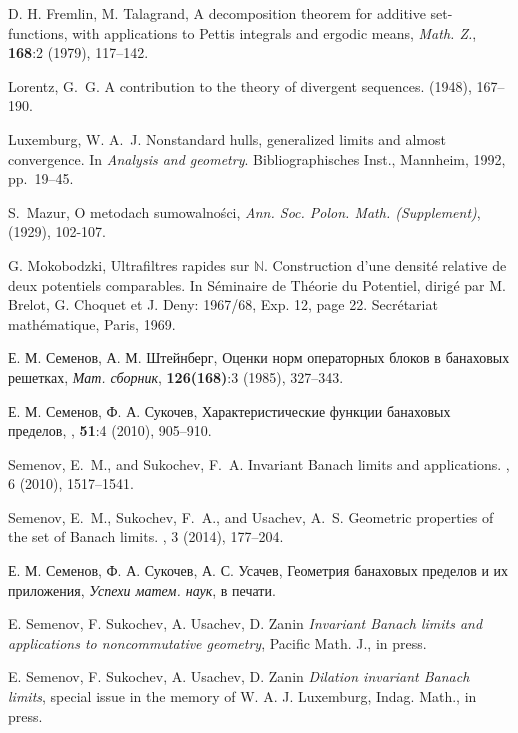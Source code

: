 \documentclass[12pt]{article}
\def\N{{\mathbb{N}}}
\begin{document}
\begin{thebibliography}{10}
D. H. Fremlin, M. Talagrand,
A decomposition theorem for additive set-functions, with applications to Pettis integrals and ergodic means,
\textit{Math. Z.}, \textbf{168}:2 (1979), 117--142.

{\sc Lorentz, G.~G.}
\newblock A contribution to the theory of divergent sequences.
 (1948), 167--190.

{\sc Luxemburg, W. A.~J.}
\newblock Nonstandard hulls, generalized limits and almost convergence.
\newblock In {\em Analysis and geometry}. Bibliographisches Inst., Mannheim,
  1992, pp.~19--45.

S.~Mazur,
\newblock O metodach sumowalno{\'{s}}ci,
\newblock \textit{Ann. Soc. Polon.
  Math. (Supplement)}, (1929), 102-107.

G. Mokobodzki, Ultrafiltres rapides sur $\N$. Construction d'une densit\'e relative de deux
potentiels comparables. In S\'eminaire de Th\'eorie du Potentiel, dirig\'e par M. Brelot, G.
Choquet et J. Deny: 1967/68, Exp. 12, page 22. Secr\'etariat math\'ematique, Paris, 1969.

{ Е. М. Семенов, А. М. Штейнберг},
{Оценки норм операторных блоков в банаховых решетках},
\newblock \textit{ Мат. сборник}, \textbf{126(168)}:3 (1985), 327--343.

{ Е. М. Семенов, Ф. А. Сукочев},
{ Характеристические функции банаховых пределов},
, \textbf{51}:4 (2010), 905--910.

{\sc Semenov, E.~M., and Sukochev, F.~A.}
\newblock Invariant {B}anach limits and applications.
, 6 (2010), 1517--1541.

{\sc Semenov, E.~M., Sukochev, F.~A., and Usachev, A.~S.}
\newblock Geometric properties of the set of {B}anach limits.
, 3 (2014), 177--204.

{ Е. М. Семенов, Ф. А. Сукочев, А. С. Усачев},
{Геометрия банаховых пределов и их приложения},
\newblock \textit{Успехи матем. наук}, в печати.

 E. Semenov, F. Sukochev, A. Usachev, D. Zanin \textit{Invariant Banach limits and applications to noncommutative geometry}, Pacific Math. J., in press.

 E. Semenov, F. Sukochev, A. Usachev, D. Zanin \textit{Dilation invariant Banach limits}, special issue in the memory of W. A. J. Luxemburg, Indag. Math., in press.


\end{thebibliography}
\end{document}
